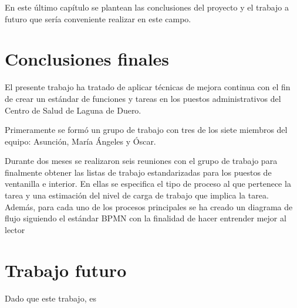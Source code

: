 En este último capítulo se plantean las conclusiones del proyecto y el trabajo a futuro que sería conveniente realizar en este campo.

\section{Conclusiones finales}

El presente trabajo ha tratado de aplicar técnicas de mejora continua con el fin de crear un estándar de funciones y tareas en los puestos administrativos del Centro de Salud de Laguna de Duero.

Primeramente se formó un grupo de trabajo con tres de los siete miembros del equipo: Asunción, María Ángeles y Óscar.

Durante dos meses se realizaron seis reuniones con el grupo de trabajo para finalmente obtener las listas de trabajo estandarizadas para los puestos de ventanilla e interior. En ellas se especifica el tipo de proceso al que pertenece la tarea y una estimación del nivel de carga de trabajo que implica la tarea. Además, para cada uno de los procesos principales se ha creado un diagrama de flujo siguiendo el estándar BPMN con la finalidad de hacer entrender mejor al lector

\section{Trabajo futuro}

Dado que este trabajo, es